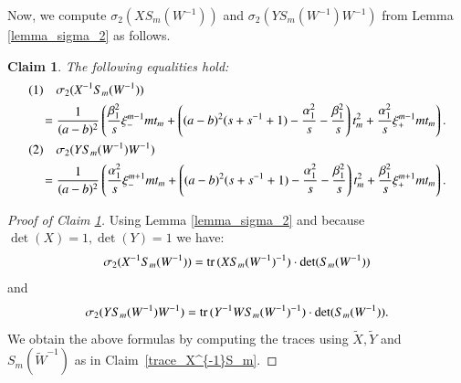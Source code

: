 \documentclass[a4paper]{amsart}
\theoremstyle{plain}
\newtheorem{claim}[theorem]{Claim}
\theoremstyle{definition}
\theoremstyle{remark}
\newcommand{\trace}{{\rm tr}\,}
\begin{document}
Now, we compute $\sigma_2(XS_m(W^{-1}))$ and $\sigma_2(YS_m(W^{-1})W^{-1})$
from Lemma \ref{lemma_sigma_2} as follows.
%
\begin{claim}\label{sigma_2_result}
The following equalities hold: 
\begin{align*}
\lefteqn{
  (1) \quad
  \sigma_2(X^{-1}S_m(W^{-1}))
}
& \\
&\quad=
  \frac{1}{(a-b)^2}
  \left(
    \frac{\beta^2_1}{s} \xi_{-}^{m-1}m t_m 
    + \left((a-b)^2(s+s^{-1}+1) - \frac{\alpha^2_1}{s} - \frac{\beta^2_1}{s} \right) t_m^2 + \frac{\alpha^2_1}{s} \xi_{+}^{m-1} m t_m
  \right).\\
\lefteqn{
  (2) \quad
  \sigma_2(YS_m(W^{-1})W^{-1})
}
& \\
&\quad=
  \frac{1}{(a-b)^2}
  \left(
    \frac{\alpha^2_1}{s} \xi_{-}^{m+1}m t_m 
    + \left((a-b)^2(s+s^{-1}+1) - \frac{\alpha^2_1}{s} - \frac{\beta^2_1}{s} \right) t_m^2
    + \frac{\beta^2_1}{s} \xi_{+}^{m+1} m t_m
  \right).
\end{align*}
\end{claim}
\begin{proof}[Proof of Claim \ref{sigma_2_result}]
Using Lemma \ref{lemma_sigma_2} and because $\det(X)=1, \det(Y) = 1$ we have:
\[
\sigma_2(X^{-1}S_m(W^{-1})) = \trace(X S_m(W^{-1})^{-1})\cdot \det(S_m(W^{-1}))
\] 
and 
\[
\sigma_2(YS_m(W^{-1}) W^{-1}) = \trace(Y^{-1} W S_m(W^{-1})^{-1})\cdot \det(S_m(W^{-1})).
\]
We obtain the above formulas by computing the traces using $\tilde X, \tilde Y$ and $S_m(\tilde W^{-1})$ as in Claim~\ref{trace_X^{-1}S_m}.
\end{proof}
\end{document}
